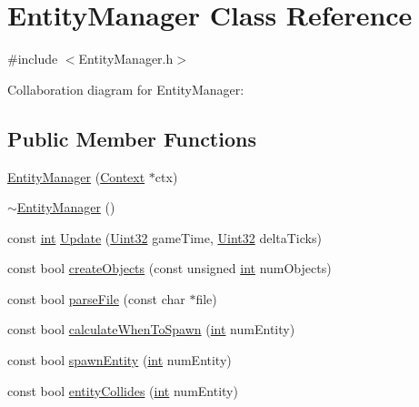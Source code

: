 \hypertarget{class_entity_manager}{\section{Entity\-Manager Class Reference}
\label{class_entity_manager}
}


{\ttfamily \#include $<$Entity\-Manager.\-h$>$}



Collaboration diagram for Entity\-Manager\-:
\subsection*{Public Member Functions}
\begin{DoxyCompactItemize}
\item 
\hyperlink{class_entity_manager_a726e5ed5295b0b1579c112169acc8e88}{Entity\-Manager} (\hyperlink{class_context}{Context} $\ast$ctx)
\item 
\hyperlink{class_entity_manager_a71a36c9fb8d579a1a1ec108e0fccf175}{$\sim$\-Entity\-Manager} ()
\item 
const \hyperlink{_s_d_l__thread_8h_a6a64f9be4433e4de6e2f2f548cf3c08e}{int} \hyperlink{class_entity_manager_ae34d5cb8444503fbc4a5bc2db4878c41}{Update} (\hyperlink{_s_d_l__stdinc_8h_add440eff171ea5f55cb00c4a9ab8672d}{Uint32} game\-Time, \hyperlink{_s_d_l__stdinc_8h_add440eff171ea5f55cb00c4a9ab8672d}{Uint32} delta\-Ticks)
\item 
const bool \hyperlink{class_entity_manager_af35b8ae019b5ff399a03452e93a5e72a}{create\-Objects} (const unsigned \hyperlink{_s_d_l__thread_8h_a6a64f9be4433e4de6e2f2f548cf3c08e}{int} num\-Objects)
\item 
const bool \hyperlink{class_entity_manager_aeeb13aad2ebe4e316cae99cffd61427e}{parse\-File} (const char $\ast$file)
\item 
const bool \hyperlink{class_entity_manager_a7f83a6ca14e1a7076fd6a34f7750969b}{calculate\-When\-To\-Spawn} (\hyperlink{_s_d_l__thread_8h_a6a64f9be4433e4de6e2f2f548cf3c08e}{int} num\-Entity)
\item 
const bool \hyperlink{class_entity_manager_a8aa9b1106b19aef236dd35a5122a1a12}{spawn\-Entity} (\hyperlink{_s_d_l__thread_8h_a6a64f9be4433e4de6e2f2f548cf3c08e}{int} num\-Entity)
\item 
const bool \hyperlink{class_entity_manager_a1dbaa7017a4073a5ca1ab4704f1f0f38}{entity\-Collides} (\hyperlink{_s_d_l__thread_8h_a6a64f9be4433e4de6e2f2f548cf3c08e}{int} num\-Entity)
\end{DoxyCompactItemize}
